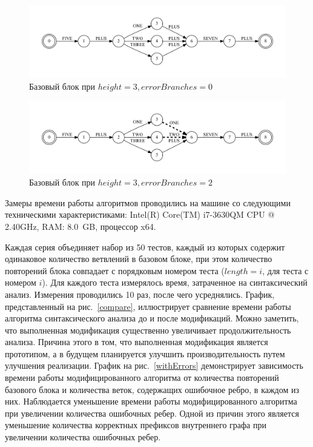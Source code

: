 \begin{figure}[h!]
 \centering
 \includegraphics[width=15cm]{pictures/block_black.pdf}
 \caption{Базовый блок при $height=3, errorBranches=0$}
 \label{block}
\end{figure}

\begin{figure}[h!]
 \centering
 \includegraphics[width=15cm]{pictures/errorBlock_black.pdf}
 \caption{Базовый блок при $height=3, errorBranches=2$}
 \label{errorBlock}
\end{figure}

Замеры времени работы алгоритмов проводились на машине со следующими техническими характеристиками: Intel(R) Core(TM) i7-3630QM CPU @ 2.40GHz, RAM: 8.0~GB, процессор x64.

Каждая серия объединяет набор из 50 тестов, каждый из которых содержит одинаковое количество ветвлений в базовом блоке, при этом количество повторений блока совпадает с порядковым номером теста ($length = i$, для теста с номером $i$). Для каждого теста измерялось время, затраченное на синтаксический анализ. Измерения проводились 10 раз, после чего усреднялись. График, представленный на рис.~\ref{compare}, иллюстрирует сравнение времени работы алгоритма синтаксического анализа до и после модификаций. Можно заметить, что выполненная модификация существенно увеличивает продолжительность анализа. Причина этого в том, что выполненная модификация является прототипом, а в будущем планируется улучшить производительность путем улучшения реализации. График на рис.~\ref{withErrors} демонстрирует зависимость времени работы модифицированного алгоритма от количества повторений базового блока и количества веток, содержащих ошибочное ребро, в каждом из них. Наблюдается уменьшение времени работы модифицированного алгоритма при увеличении количества ошибочных ребер. Одной из причин этого является уменьшение количества корректных префиксов внутреннего графа при увеличении количества ошибочных ребер.

